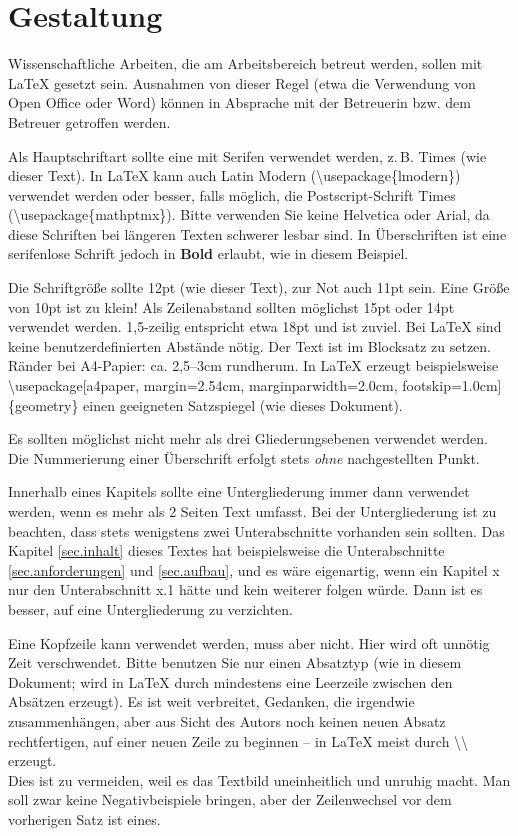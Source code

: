 \documentclass[
    fontsize=12pt,
    headings=small,
    parskip=half,           %
    bibliography=totoc,
    numbers=noenddot,       %
    open=any,               %
    ]{scrreprt}
\begin{document}
\section{Gestaltung}

Wissenschaftliche Arbeiten, die am Arbeitsbereich betreut werden, sollen mit LaTeX gesetzt sein. Ausnahmen von dieser Regel (etwa die Verwendung von Open Office oder Word) können in Absprache mit der Betreuerin bzw. dem Betreuer getroffen werden.

Als Hauptschriftart sollte eine mit Serifen verwendet werden, z.\,B. Times (wie dieser Text). In LaTeX kann auch Latin Modern (\textbackslash usepackage\{lmodern\}) verwendet werden oder besser, falls möglich, die Postscript-Schrift Times (\textbackslash usepackage\{mathptmx\}). Bitte verwenden Sie keine \textsf{Helvetica} oder \textsf{Arial}, da diese Schriften bei längeren Texten schwerer lesbar sind. In Überschriften ist eine serifenlose Schrift jedoch in \textsf{\textbf{Bold}} erlaubt, wie in diesem Beispiel.

Die Schriftgröße sollte 12pt (wie dieser Text), zur Not auch 11pt sein. Eine Größe von 10pt ist zu klein! Als Zeilenabstand sollten möglichst 15pt oder 14pt verwendet werden. 1,5-zeilig entspricht etwa 18pt und ist zuviel. Bei LaTeX sind keine benutzerdefinierten Abstände nötig. Der Text ist im Blocksatz zu setzen. Ränder bei A4-Papier: ca. 2,5--3cm rundherum. In LaTeX erzeugt beispielsweise \textbackslash usepackage[a4paper, margin=2.54cm, marginparwidth=2.0cm, footskip=1.0cm]\{geometry\} einen geeigneten Satzspiegel (wie dieses Dokument).

Es sollten möglichst nicht mehr als drei Gliederungsebenen verwendet werden. Die Nummerierung einer Überschrift erfolgt stets \emph{ohne} nachgestellten Punkt. 

Innerhalb eines Kapitels sollte eine Untergliederung immer dann verwendet werden, wenn es mehr als 2 Seiten Text umfasst. Bei der Untergliederung ist zu beachten, dass stets wenigstens zwei Unterabschnitte vorhanden sein sollten. Das Kapitel \ref{sec.inhalt} dieses Textes hat beispielsweise die Unterabschnitte \ref{sec.anforderungen} und \ref{sec.aufbau}, und es wäre eigenartig, wenn ein Kapitel x nur den Unterabschnitt x.1 hätte und kein weiterer folgen würde. Dann ist es besser, auf eine Untergliederung zu verzichten.

Eine Kopfzeile kann verwendet werden, muss aber nicht. Hier wird oft unnötig Zeit verschwendet. Bitte benutzen Sie nur einen Absatztyp (wie in diesem Dokument; wird in LaTeX durch mindestens eine Leerzeile zwischen den Absätzen erzeugt). Es ist weit verbreitet, Gedanken, die irgendwie zusammenhängen, aber aus Sicht des Autors noch keinen neuen Absatz rechtfertigen, auf einer neuen Zeile zu beginnen -- in LaTeX meist durch {\textbackslash\textbackslash} erzeugt.\\ Dies ist zu vermeiden, weil es das Textbild uneinheitlich und unruhig macht. Man soll zwar keine Negativbeispiele bringen, aber der Zeilenwechsel vor dem vorherigen Satz ist eines.
\end{document}
